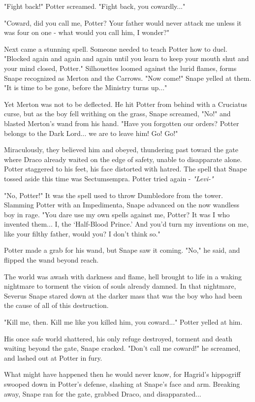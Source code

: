 "Fight back!" Potter screamed. "Fight back, you cowardly..."

"Coward, did you call me, Potter? Your father would never attack me unless it was four on one - what would you call him, I wonder?"

Next came a stunning spell. Someone needed to teach Potter how to duel. "Blocked again and again and again until you learn to keep your mouth shut and your mind closed, Potter." Silhouettes loomed against the lurid flames, forms Snape recognized as Merton and the Carrows. "Now come!" Snape yelled at them. "It is time to be gone, before the Ministry turns up..."

Yet Merton was not to be deflected. He hit Potter from behind with a Cruciatus curse, but as the boy fell writhing on the grass, Snape screamed, "No!" and blasted Merton's wand from his hand. "Have you forgotten our orders? Potter belongs to the Dark Lord... we are to leave him! Go! Go!"

Miraculously, they believed him and obeyed, thundering past toward the gate where Draco already waited on the edge of safety, unable to disapparate alone. Potter staggered to his feet, his face distorted with hatred. The spell that Snape tossed aside this time was Sectumsempra. Potter tried again - \emph{"Levi-"}

"No, Potter!" It was the spell used to throw Dumbledore from the tower. Slamming Potter with an Impedimenta, Snape advanced on the now wandless boy in rage. "You dare use my own spells against me, Potter? It was I who invented them... I, the `Half-Blood Prince.' And you'd turn my inventions on me, like your filthy father, would you? I don't think so."

Potter made a grab for his wand, but Snape saw it coming. "No," he said, and flipped the wand beyond reach.

The world was awash with darkness and flame, hell brought to life in a waking nightmare to torment the vision of souls already damned. In that nightmare, Severus Snape stared down at the darker mass that was the boy who had been the cause of all of this destruction.

"Kill me, then. Kill me like you killed him, you coward..." Potter yelled at him.

His once safe world shattered, his only refuge destroyed, torment and death waiting beyond the gate, Snape cracked. "Don't call me coward!" he screamed, and lashed out at Potter in fury.

What might have happened then he would never know, for Hagrid's hippogriff swooped down in Potter's defense, slashing at Snape's face and arm. Breaking away, Snape ran for the gate, grabbed Draco, and disapparated...


